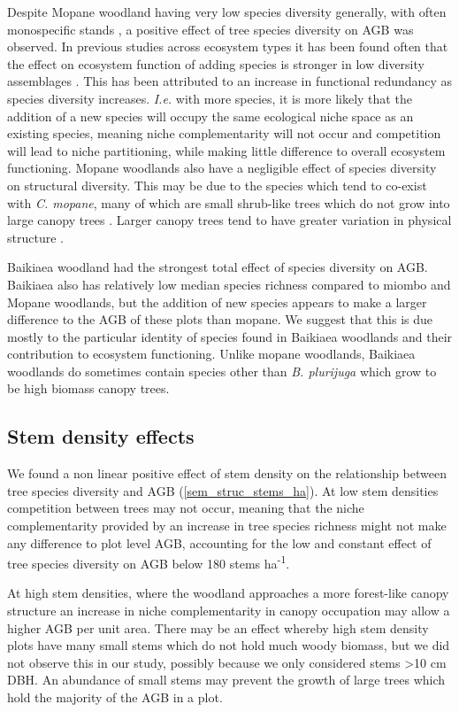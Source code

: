 \documentclass[11pt,a4paper]{article}
\begin{document}
Despite Mopane woodland having very low species diversity generally, with often monospecific stands \citep{Timberlake2010}, a positive effect of tree species diversity on AGB was observed. In previous studies across ecosystem types it has been found often that the effect on ecosystem function of adding species is stronger in low diversity assemblages \citep{Hector2007}. This has been attributed to an increase in functional redundancy as species diversity increases. \textit{I.e.} with more species, it is more likely that the addition of a new species will occupy the same ecological niche space as an existing species, meaning niche complementarity will not occur and competition will lead to niche partitioning, while making little difference to overall ecosystem functioning. Mopane woodlands also have a negligible effect of species diversity on structural diversity. This may be due to the species which tend to co-exist with \textit{C. mopane}, many of which are small shrub-like trees which do not grow into large canopy trees \citep{Timberlake2010}. Larger canopy trees tend to have greater variation in physical structure \citep{Seidel2019}.

Baikiaea woodland had the strongest total effect of species diversity on AGB. Baikiaea also has relatively low median species richness compared to miombo and Mopane woodlands, but the addition of new species appears to make a larger difference to the AGB of these plots than mopane. We suggest that this is due mostly to the particular identity of species found in Baikiaea woodlands and their contribution to ecosystem functioning. Unlike mopane woodlands, Baikiaea woodlands do sometimes contain species other than \textit{B. plurijuga} which grow to be high biomass canopy trees. 

\subsection{Stem density effects}

We found a non linear positive effect of stem density on the relationship between tree species diversity and AGB (\autoref{sem_struc_stems_ha}). At low stem densities competition between trees may not occur, meaning that the niche complementarity provided by an increase in tree species richness might not make any difference to plot level AGB, accounting for the low and constant effect of tree species diversity on AGB below \textapprox{}180 stems ha\textsuperscript{-1}.

At high stem densities, where the woodland approaches a more forest-like canopy structure an increase in niche complementarity in canopy occupation may allow a higher AGB per unit area. There may be an effect whereby high stem density plots have many small stems which do not hold much woody biomass, but we did not observe this in our study, possibly because we only considered stems >10 cm DBH. An abundance of small stems may prevent the growth of large trees which hold the majority of the AGB in a plot.
\end{document}
